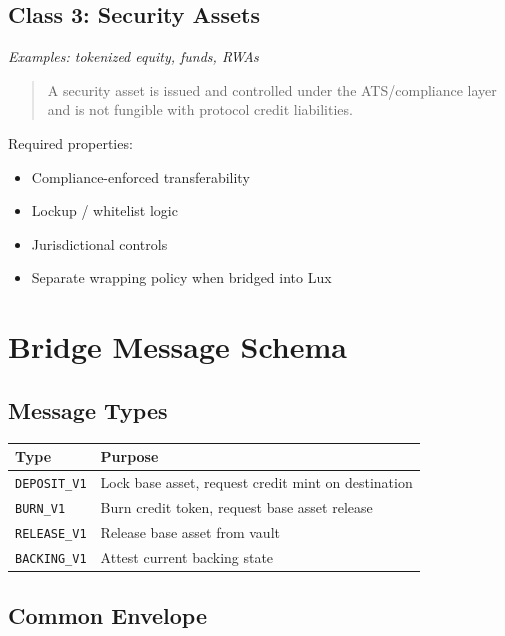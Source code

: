 \documentclass[11pt,a4paper]{article}
\begin{document}
\subsection{Class 3: Security Assets}

\textit{Examples: tokenized equity, funds, RWAs}

\begin{quote}
A security asset is issued and controlled under the ATS/compliance layer and is not fungible with protocol credit liabilities.
\end{quote}

Required properties:
\begin{itemize}[leftmargin=2em]
\item Compliance-enforced transferability
\item Lockup / whitelist logic
\item Jurisdictional controls
\item Separate wrapping policy when bridged into Lux
\end{itemize}

\section{Bridge Message Schema}

\subsection{Message Types}

\begin{center}
\begin{tabular}{ll}
\toprule
\textbf{Type} & \textbf{Purpose} \\
\midrule
\texttt{DEPOSIT\_V1} & Lock base asset, request credit mint on destination \\
\texttt{BURN\_V1} & Burn credit token, request base asset release \\
\texttt{RELEASE\_V1} & Release base asset from vault \\
\texttt{BACKING\_V1} & Attest current backing state \\
\bottomrule
\end{tabular}
\end{center}

\subsection{Common Envelope}
\end{document}
